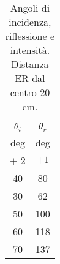 \begin{table}[H]
    \begin{center}
    \begin{tabular}{|c|c|}
        \hline
            $\theta_i$  & $\theta_r$    \\
            deg         & deg           \\
            $\pm$ 2     & $\pm 1$         \\ \hline
%    
            40 & 80  \\
            30 & 62  \\
            50 & 100 \\
            60 & 118 \\
            70 & 137 \\ \hline
%  
    \end{tabular}
    \end{center}
    \caption{ Angoli di incidenza, riflessione e intensità. Distanza ER dal centro 20 cm.}
    \label{O4_P1_cartesio}
\end{table}
